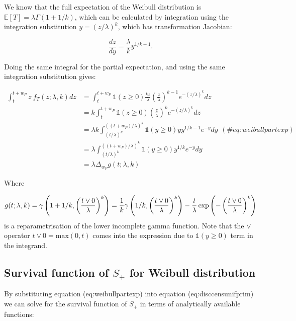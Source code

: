 \documentclass[10pt,letterpaper]{article}
\begin{document}
We know that the full expectation of the Weibull distribution is $\mathbb{E}[T] = \lambda \Gamma(1 + 1/k)$, which can be calculated by integration using the integration substitution $y = (z / \lambda)^k$, which has transformation Jacobian:

\begin{equation}
\frac{dz}{dy} = \frac{\lambda}{k}y^{1/k - 1}.
\end{equation}

Doing the same integral for the partial expectation, and using the same integration substitution gives:

\begin{equation}
\begin{aligned}
\int_{t}^{t+w_P} z~ f_T(z; \lambda,k) dz  &= \int_t^{t+w_P} \mathbb{1}(z \geq 0) \frac{kz}{\lambda}\left(\frac{z}{\lambda}\right)^{k-1}e^{-(z/\lambda)^{k}} dz \\
&= k\int_t^{t+w_P} \mathbb{1}(z \geq 0) \left(\frac{z}{\lambda}\right)^{k}e^{-(z/\lambda)^{k}} dz  \\
&= \lambda k \int_{(t / \lambda)^k}^{((t + w_P) / \lambda)^k} \mathbb{1}(y \geq 0) y y^{1/k - 1} e^{-y} dy  \\
&= \lambda\int_{(t / \lambda)^k}^{((t + w_P) / \lambda)^k} \mathbb{1}(y \geq 0)  y^{1/k} e^{-y} dy\\
&= \lambda \Delta_{w_P} g(t; \lambda,k)
\end{aligned} (\#eq:weibullpartexp)
\end{equation}

Where

\begin{equation}
g(t; \lambda, k) =  \gamma\left(1 + 1/k, \left({t\vee 0 \over \lambda}\right)^k\right) =  \frac{1}{k}\gamma\left(1/k, \left({t\vee 0 \over \lambda}\right)^k\right) - \frac{t}{\lambda}\exp\left(-\left({t\vee 0 \over \lambda}\right)^k\right)
\end{equation}
is a reparametrisation of the lower incomplete gamma function. Note that the $\vee$ operator $t \vee 0 = \text{max}(0, t)$ comes into the expression due to $\mathbb{1}(y \geq 0)$ term in the integrand.

\subsection{Survival function of $S_{+}$ for Weibull distribution}

By substituting equation \@ref(eq:weibullpartexp) into equation \@ref(eq:disccensunifprim) we can solve for the survival function of $S_+$ in terms of analytically available functions:
\end{document}
